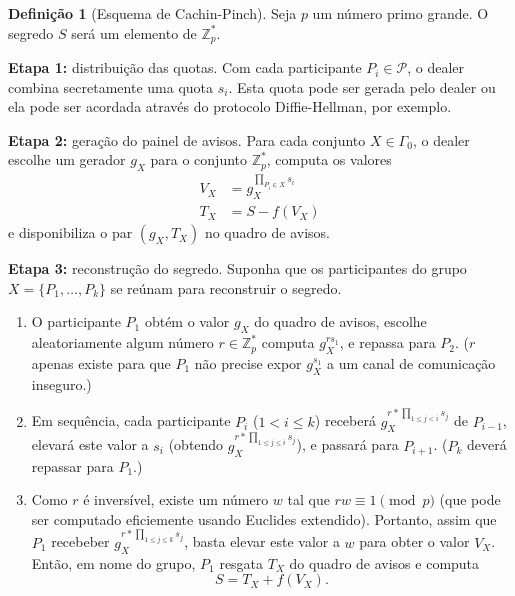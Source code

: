 \documentclass[10pt,twocolumn]{article}
\theoremstyle{definition}
\newtheorem{definition}[theorem]{Definição}
\begin{document}
\begin{definition}[Esquema de Cachin-Pinch]
    Seja $p$ um número primo grande.
    O segredo $S$ será um elemento de $\mathbb Z_p^*$.

    \textbf{Etapa 1:} distribuição das quotas.
    Com cada participante $P_i \in \mathcal P$,
    o dealer combina secretamente uma quota $s_i$.
    Esta quota pode ser gerada pelo dealer
    ou ela pode ser acordada através do protocolo Diffie-Hellman,
    por exemplo.

    \textbf{Etapa 2:} geração do painel de avisos.
    Para cada conjunto $X \in \Gamma_0$,
    o dealer escolhe um gerador $g_X$ para o conjunto $\mathbb Z_p^*$,
    computa os valores
    \begin{align*}
        V_X &= g_X^{\prod_{P_i \in X} s_i} \\
        T_X &= S - f( V_X )
    \end{align*}
    e disponibiliza o par $(g_X, T_X)$
    no quadro de avisos.

    \textbf{Etapa 3:} reconstrução do segredo.
    Suponha que os participantes do grupo $X = \{P_1, \dots, P_k\}$
    se reúnam para reconstruir o segredo.
    \begin{enumerate}
        \item O participante $P_1$ obtém o valor $g_X$ do quadro de avisos,
            escolhe aleatoriamente algum número $r \in \mathbb Z_p^*$
            computa $g_X^{r s_1}$,
            e repassa para $P_2$.
            ($r$ apenas existe para que $P_1$ não precise expor $g_X^{s_1}$
            a um canal de comunicação inseguro.)

        \item Em sequência, cada participante $P_i$ ($1 < i \leq k$)
            receberá $g_X^{r * \prod_{1 \leq j < i} s_j}$ de $P_{i-1}$,
            elevará este valor a $s_i$
            (obtendo $g_X^{r * \prod_{1 \leq j \leq i} s_j}$),
            e passará para $P_{i+1}$.
            ($P_k$ deverá repassar para $P_1$.)

        \item Como $r$ é inversível,
            existe um número $w$ tal que $rw \equiv 1 \pmod p$
            (que pode ser computado eficiemente usando Euclides extendido).
            Portanto,
            assim que $P_1$ recebeber
            $g_X^{r * \prod_{1 \leq j \leq k} s_j}$,
            basta elevar este valor a $w$ para obter o valor $V_X$.
            Então, em nome do grupo,
            $P_1$ resgata $T_X$ do quadro de avisos e computa
            \begin{equation*}
                S = T_X + f(V_X).
            \end{equation*}
    \end{enumerate}
\end{definition}
\end{document}
